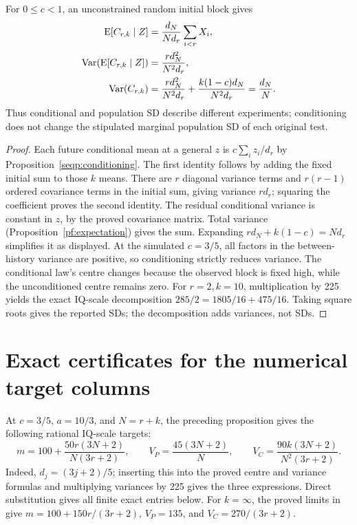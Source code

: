 \begin{proposition}
\label{seqp:variance-decomposition}
For \(0\leq c<1\), an unconstrained random initial block gives
\begin{align*}
 \operatorname{E}[C_{r,k}\mid Z]&=\frac{d_N}{Nd_r}\sum_{i<r}X_i,\\
 \operatorname{Var}(\operatorname{E}[C_{r,k}\mid Z])&=\frac{r d_N^2}{N^2d_r},\\
 \operatorname{Var}(C_{r,k})&=\frac{r d_N^2}{N^2d_r}
                 +\frac{k(1-c)d_N}{N^2d_r}=\frac{d_N}{N}.
\end{align*}
Thus conditional and population SD describe different experiments;
conditioning does not change the stipulated marginal population SD of
each original test.
\end{proposition}
\begin{proof}
Each future conditional mean at a general \(z\) is
\(c\sum_i z_i/d_r\) by Proposition~\ref{seqp:conditioning}. The first
identity follows by adding the fixed initial sum to those \(k\) means.
There are \(r\) diagonal variance terms and \(r(r-1)\) ordered
covariance terms in the initial sum, giving variance \(rd_r\); squaring
the coefficient proves the second identity. The residual conditional
variance is constant in \(z\), by the proved covariance matrix.
Total variance (Proposition~\ref{pf:expectation}) gives the sum. Expanding
\(r d_N+k(1-c)=Nd_r\) simplifies it as displayed. At the simulated
\(c=3/5\), all factors in the between-history variance are positive,
so conditioning strictly reduces variance. The conditional law's centre
changes because the observed block is fixed high, while the unconditioned
centre remains zero. For \(r=2,k=10\), multiplication by 225 yields the
exact IQ-scale decomposition
\(285/2=1805/16+475/16\). Taking square roots gives the reported SDs;
the decomposition adds variances, not SDs.
\end{proof}

\section{Exact certificates for the numerical target columns}
\label{seqp:exact-grid}
At \(c=3/5\), \(a=10/3\), and \(N=r+k\), the preceding proposition
gives the following rational IQ-scale targets:
\[
 m=100+\frac{50r(3N+2)}{N(3r+2)},\qquad
 V_P=\frac{45(3N+2)}N,\qquad
 V_C=\frac{90k(3N+2)}{N^2(3r+2)}.
\]
Indeed, \(d_j=(3j+2)/5\); inserting this into the proved centre and
variance formulas and multiplying variances by 225 gives the three
expressions. Direct substitution gives all finite exact entries below.
For \(k=\infty\), the proved limits in 
give \(m=100+150r/(3r+2)\), \(V_P=135\), and
\(V_C=270/(3r+2)\).

